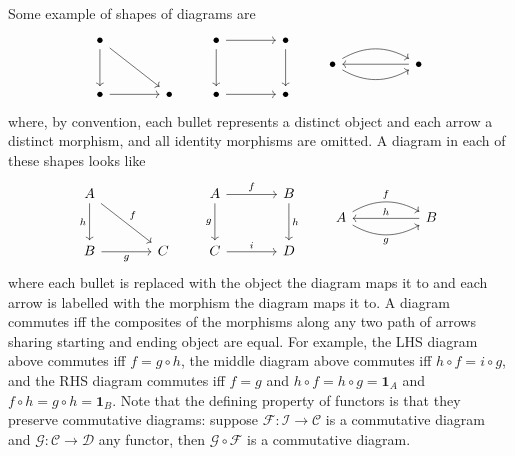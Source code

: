 \documentclass[11pt]{book}
\begin{document}
\begin{example}Some example of shapes of diagrams are
\[
\begin{tikzcd}[sep = large]
\bullet \arrow[d] \arrow[rd] &   \\
\bullet \arrow[r]                 & \bullet
\end{tikzcd}
\qquad
\begin{tikzcd}[sep = large]
\bullet \arrow[r] \arrow[d] & \bullet \arrow[d] \\
\bullet \arrow[r]                 & \bullet         
\end{tikzcd}
\qquad
\begin{tikzcd}[sep = huge]
\bullet \arrow[r, bend left] \arrow[r, bend right] & \bullet \arrow[l]
\end{tikzcd}
\]
where, by convention, each bullet represents a distinct object and each arrow a distinct morphism, and all identity morphisms are omitted. A diagram in each of these shapes looks like
\[
\begin{tikzcd}[sep = large]
A \arrow[d, "h"'] \arrow[rd, "f"] &   \\
B \arrow[r, "g"']                 & C
\end{tikzcd}
\qquad
\begin{tikzcd}[sep = large]
A \arrow[r, "f"] \arrow[d, "g"'] & B \arrow[d, "h"] \\
C \arrow[r, "i"]                 & D         
\end{tikzcd}
\qquad
\begin{tikzcd}[sep = huge]
A \arrow[r, "f", bend left] \arrow[r, "g"', bend right] & B \arrow[l, "h"']
\end{tikzcd}
\]
where each bullet is replaced with the object the diagram maps it to and each arrow is labelled with the morphism the diagram maps it to. A diagram commutes iff the composites of the morphisms along any two path of arrows sharing starting and ending object are equal. For example, the LHS diagram above commutes iff $f=g\circ h$, the middle diagram above commutes iff $h\circ f=i\circ g$, and the RHS diagram commutes iff $f=g$ and $h\circ f=h\circ g=\mathbf 1_A$ and $f\circ h=g\circ h=\mathbf 1_B$. Note that the defining property of functors is that they preserve commutative diagrams: suppose $\mathscr{F}:\mathcal{I}\rightarrow\mathcal C$ is a commutative diagram and $\mathscr{G}:\mathcal C\rightarrow \mathcal D$ any functor, then $\mathscr G\circ \mathscr F$ is a commutative diagram.
\end{example}
\end{document}
